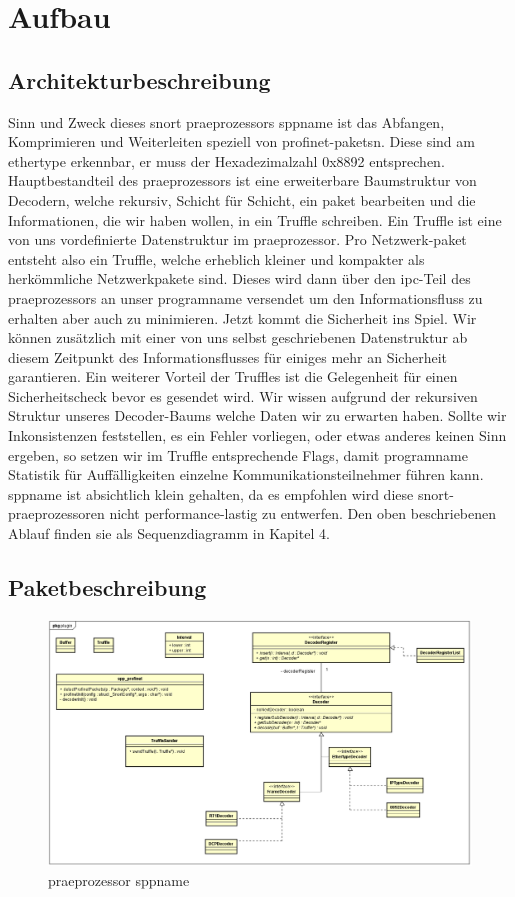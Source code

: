 \chapter{Aufbau \sppname}

\section{Architekturbeschreibung}

Sinn und Zweck dieses \gls{snort} \gls{praeprozessor}s \gls{sppname} ist das Abfangen,
Komprimieren und Weiterleiten speziell von \gls{profinet}-\glspl{paket}n. Diese
sind am \gls{ethertype} erkennbar, er muss der Hexadezimalzahl 0x8892 entsprechen.
Hauptbestandteil des \gls{praeprozessor}s ist eine erweiterbare Baumstruktur von Decodern, welche rekursiv, Schicht für Schicht, ein \gls{paket} bearbeiten und die Informationen, die wir haben wollen, in ein Truffle schreiben. Ein Truffle ist eine von uns vordefinierte Datenstruktur im \gls{praeprozessor}.
Pro Netzwerk-\gls{paket} entsteht also ein Truffle, welche erheblich kleiner und kompakter als herkömmliche Netzwerkpakete sind. Dieses wird dann über den \gls{ipc}-Teil des \gls{praeprozessor}s
an unser \gls{programname} versendet um den Informationsfluss zu erhalten aber auch zu minimieren.\newline
Jetzt kommt die Sicherheit ins Spiel. Wir können zusätzlich mit einer von uns selbst geschriebenen Datenstruktur ab diesem Zeitpunkt des Informationsflusses für einiges mehr an Sicherheit garantieren.
Ein weiterer Vorteil der Truffles ist die Gelegenheit für einen Sicherheitscheck bevor es gesendet wird. Wir wissen aufgrund der rekursiven Struktur unseres Decoder-Baums welche Daten wir zu erwarten haben. Sollte wir Inkonsistenzen feststellen, es ein Fehler vorliegen, oder etwas anderes keinen Sinn ergeben, so setzen wir im Truffle entsprechende Flags, damit \gls{programname} Statistik für Auffälligkeiten einzelne Kommunikationsteilnehmer führen kann.\newline
\gls{sppname} ist absichtlich klein gehalten, da es empfohlen wird diese \gls{snort}-\gls{praeprozessor}en nicht performance-lastig zu entwerfen. Den oben beschriebenen Ablauf finden sie als Sequenzdiagramm in Kapitel 4.


\section{Paketbeschreibung}


\begin{figure}[H]
  \centering
  \includegraphics[width=\textwidth]{../diagramimages/spp_profinet.png}
  \caption{\gls{praeprozessor} \gls{sppname}}
\end{figure}
